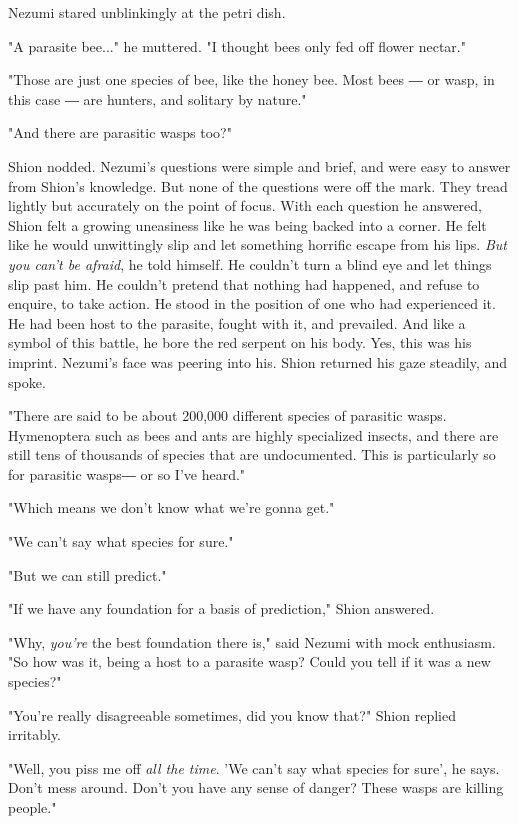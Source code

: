 Nezumi stared unblinkingly at the petri dish.

"A parasite bee..." he muttered. "I thought bees only fed off flower
nectar."

"Those are just one species of bee, like the honey bee. Most bees ― or
wasp, in this case ― are hunters, and solitary by nature."

"And there are parasitic wasps too?"

Shion nodded. Nezumi's questions were simple and brief, and were easy to
answer from Shion's knowledge. But none of the questions were off the
mark. They tread lightly but accurately on the point of focus. With each
question he answered, Shion felt a growing uneasiness like he was being
backed into a corner. He felt like he would unwittingly slip and let
something horrific escape from his lips. \emph{But you can't be afraid}, he
told himself. He couldn't turn a blind eye and let things slip past him.
He couldn't pretend that nothing had happened, and refuse to enquire, to
take action. He stood in the position of one who had experienced it. He
had been host to the parasite, fought with it, and prevailed. And like a
symbol of this battle, he bore the red serpent on his body. Yes, this
was his imprint. Nezumi's face was peering into his. Shion returned his
gaze steadily, and spoke.

"There are said to be about 200,000 different species of parasitic
wasps. Hymenoptera such as bees and ants are highly specialized insects,
and there are still tens of thousands of species that are undocumented.
This is particularly so for parasitic wasps― or so I've heard."

"Which means we don't know what we're gonna get."

"We can't say what species for sure."

"But we can still predict."

"If we have any foundation for a basis of prediction," Shion answered.

"Why, \emph{you're} the best foundation there is," said Nezumi with mock
enthusiasm. "So how was it, being a host to a parasite wasp? Could you
tell if it was a new species?"

"You're really disagreeable sometimes, did you know that?" Shion replied
irritably.

"Well, you piss me off \emph{all the time}. 'We can't say what species for
sure', he says. Don't mess around. Don't you have any sense of danger?
These wasps are killing people."

